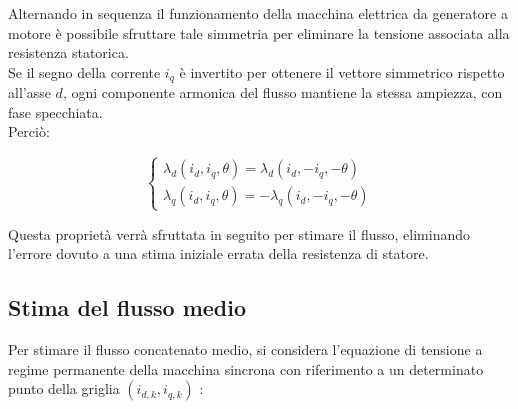 Alternando in sequenza il funzionamento della macchina elettrica da generatore a motore è possibile sfruttare tale simmetria per eliminare la tensione associata alla resistenza statorica. \\
Se il segno della corrente $i_q$ è invertito per ottenere il vettore simmetrico rispetto all'asse $d$, ogni componente armonica del flusso mantiene la stessa ampiezza, con fase specchiata.\\ Perciò:

\begin{equation}
\begin{cases}
    \lambda_d(i_d, i_q,\theta) = \lambda_d(i_d, -i_q, -\theta) \\
    \lambda_q(i_d, i_q, \theta) = -\lambda_q(i_d, -i_q, -\theta)
\end{cases}
\end{equation}

Questa proprietà verrà sfruttata in seguito per stimare il flusso,   eliminando l'errore dovuto a una stima iniziale errata della resistenza di statore.

\subsection{Stima del flusso medio}
Per stimare il flusso concatenato medio, si considera l'equazione di tensione a regime permanente della macchina sincrona con riferimento a un determinato punto della griglia $(i_{d,k},i_{q,k})$ \cite{Armando}:

